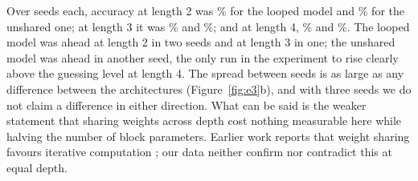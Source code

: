 Over \EThreeTiedTwoXTwoSeeds{} seeds each, accuracy at length 2 was \EThreeTiedTwoXTwoDepthTwoList\% for the looped model and \EThreeUntiedFourDepthTwoList\% for the unshared one; at length 3 it was \EThreeTiedTwoXTwoDepthThreeList\% and \EThreeUntiedFourDepthThreeList\%; and at length 4, \EThreeTiedTwoXTwoDepthFourList\% and \EThreeUntiedFourDepthFourList\%.
The looped model was ahead at length 2 in two seeds and at length 3 in one; the unshared model was ahead in another seed, the only run in the experiment to rise clearly above the guessing level at length 4.
The spread between seeds is as large as any difference between the architectures (Figure~\ref{fig:e3}b), and with three seeds we do not claim a difference in either direction.
What can be said is the weaker statement that sharing weights across depth cost nothing measurable here while halving the number of block parameters.
Earlier work reports that weight sharing favours iterative computation \citep{yang2024looped,saunshi2025latent}; our data neither confirm nor contradict this at equal depth.
